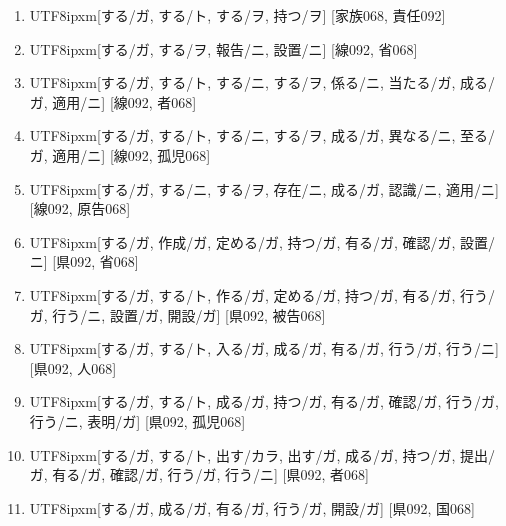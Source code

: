 \begin{enumerate}
\item \begin{CJK}{UTF8}{ipxm}[する/ガ, する/ト, する/ヲ, 持つ/ヲ] [家族068, 責任092]\end{CJK}
\item \begin{CJK}{UTF8}{ipxm}[する/ガ, する/ヲ, 報告/ニ, 設置/ニ] [線092, 省068]\end{CJK}
\item \begin{CJK}{UTF8}{ipxm}[する/ガ, する/ト, する/ニ, する/ヲ, 係る/ニ, 当たる/ガ, 成る/ガ, 適用/ニ] [線092, 者068]\end{CJK}
\item \begin{CJK}{UTF8}{ipxm}[する/ガ, する/ト, する/ニ, する/ヲ, 成る/ガ, 異なる/ニ, 至る/ガ, 適用/ニ] [線092, 孤児068]\end{CJK}
\item \begin{CJK}{UTF8}{ipxm}[する/ガ, する/ニ, する/ヲ, 存在/ニ, 成る/ガ, 認識/ニ, 適用/ニ] [線092, 原告068]\end{CJK}
\item \begin{CJK}{UTF8}{ipxm}[する/ガ, 作成/ガ, 定める/ガ, 持つ/ガ, 有る/ガ, 確認/ガ, 設置/ニ] [県092, 省068]\end{CJK}
\item \begin{CJK}{UTF8}{ipxm}[する/ガ, する/ト, 作る/ガ, 定める/ガ, 持つ/ガ, 有る/ガ, 行う/ガ, 行う/ニ, 設置/ガ, 開設/ガ] [県092, 被告068]\end{CJK}
\item \begin{CJK}{UTF8}{ipxm}[する/ガ, する/ト, 入る/ガ, 成る/ガ, 有る/ガ, 行う/ガ, 行う/ニ] [県092, 人068]\end{CJK}
\item \begin{CJK}{UTF8}{ipxm}[する/ガ, する/ト, 成る/ガ, 持つ/ガ, 有る/ガ, 確認/ガ, 行う/ガ, 行う/ニ, 表明/ガ] [県092, 孤児068]\end{CJK}
\item \begin{CJK}{UTF8}{ipxm}[する/ガ, する/ト, 出す/カラ, 出す/ガ, 成る/ガ, 持つ/ガ, 提出/ガ, 有る/ガ, 確認/ガ, 行う/ガ, 行う/ニ] [県092, 者068]\end{CJK}
\item \begin{CJK}{UTF8}{ipxm}[する/ガ, 成る/ガ, 有る/ガ, 行う/ガ, 開設/ガ] [県092, 国068]\end{CJK}

\end{enumerate}
